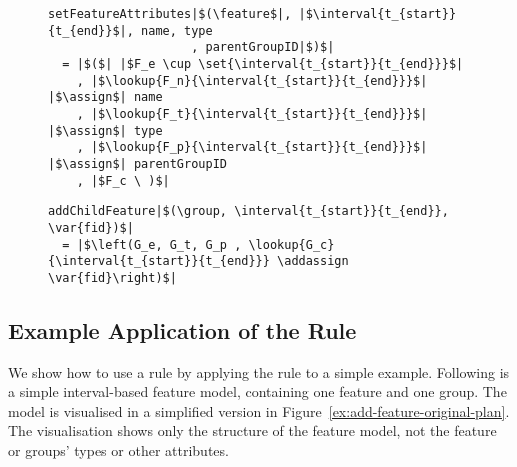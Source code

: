 \begin{figure}[h]
  \begin{verbatim}
setFeatureAttributes|$(\feature$|, |$\interval{t_{start}}{t_{end}}$|, name, type
                    , parentGroupID|$)$|
  = |$($| |$F_e \cup \set{\interval{t_{start}}{t_{end}}}$|
    , |$\lookup{F_n}{\interval{t_{start}}{t_{end}}}$| |$\assign$| name
    , |$\lookup{F_t}{\interval{t_{start}}{t_{end}}}$| |$\assign$| type
    , |$\lookup{F_p}{\interval{t_{start}}{t_{end}}}$| |$\assign$| parentGroupID
    , |$F_c \ )$|
   \end{verbatim}
  \caption{}
  \label{fun:set-feature-attributes}
\end{figure}

\begin{figure}[h]
  \begin{verbatim}
addChildFeature|$(\group, \interval{t_{start}}{t_{end}}, \var{fid})$|
  = |$\left(G_e, G_t, G_p , \lookup{G_c}{\interval{t_{start}}{t_{end}}} \addassign \var{fid}\right)$|
  \end{verbatim}
  \caption{}
  \label{fun:add-child-feature}
\end{figure}

\subsection{Example \textemdash{} Application of the  Rule}

We show how to use a rule by applying the  rule to a simple example. Following is a simple interval-based feature model, containing one feature and one group. The model is visualised in a simplified version in Figure~\ref{ex:add-feature-original-plan}. The visualisation shows only the structure of the feature model, not the feature or groups' types or other attributes.

